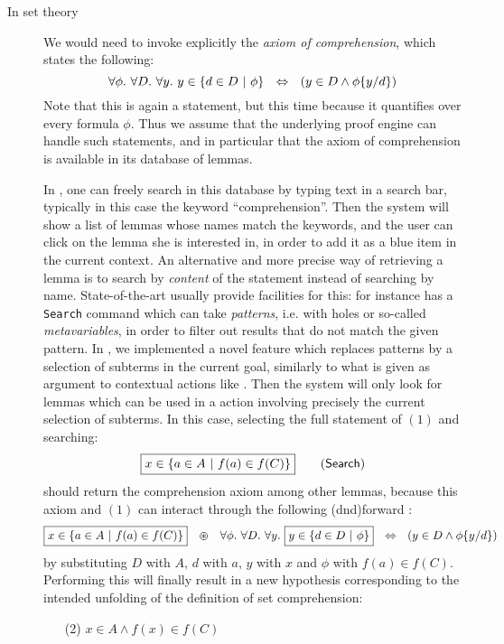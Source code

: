 \begin{description}
  \item[In  set theory]
    We would need to invoke explicitly the \emph{axiom of comprehension}, which
    states the following:
    $$\forall \phi.\ \forall D.\ \forall y.\ y \in \left\{d \in D ~\middle|~ \phi\right\}
    ~~\Leftrightarrow~~ (y \in D \land \phi \{ y / d \})$$ Note that this is again a
     statement, but this time because it quantifies over every
    formula $\phi$. Thus we assume that the underlying proof engine can handle
    such  statements, and in particular that the axiom of
    comprehension is available in its database of lemmas.
    
    In , one can freely search in this database by typing text in a search
    bar, typically in this case the keyword ``comprehension''. Then the system
    will show a list of lemmas whose names match the keywords, and the user can
    click on the lemma she is interested in, in order to add it as a blue item
    in the current context. An alternative and more precise way of retrieving a
    lemma is to search by \emph{content} of the statement instead of searching
    by name. State-of-the-art  usually provide facilities for
    this: for instance  has a \texttt{Search} command which can take
    \emph{patterns}, i.e.  with holes or so-called \emph{metavariables}, in
    order to filter out results that do not match the given pattern. In ,
    we implemented a novel feature which replaces patterns by a selection of
    subterms in the current goal, similarly to what is given as argument to
    contextual actions like . Then the system will only look for
    lemmas which can be used in a  action involving precisely the current
    selection of subterms. In this case, selecting the full statement of $(1)$
    and searching:
    $$\fbox{$x \in \left\{a \in A ~\middle|~ f(a) \in f(C)\right\}$} \qquad
    \text{(\textsf{Search})}$$
    should return the comprehension axiom among other lemmas, because this axiom
    and $(1)$ can interact through the following \kl(dnd){forward} :
    $$\fbox{$x \in \left\{a \in A ~\middle|~ f(a) \in f(C)\right\}$} ~~\operatorname{\,\varoast\,}~~ \forall \phi.\
    \forall D.\ \forall y.\ \fbox{$y \in \left\{d \in D ~\middle|~ \phi\right\}$} ~~\Leftrightarrow~~ (y
    \in D \land \phi \{ y / d \})$$ by substituting $D$ with $A$, $d$ with
    $a$, $y$ with $x$ and $\phi$ with $f(a) \in f(C)$. Performing this  will
    finally result in a new hypothesis corresponding to the intended unfolding
    of the definition of set comprehension\sidenote{Here in the sense of a
    \emph{behavioral} definition.}:
    \begin{itemize}
      \item[(2)] $x \in A \land f(x) \in f(C)$
    \end{itemize}
  

\end{description}
